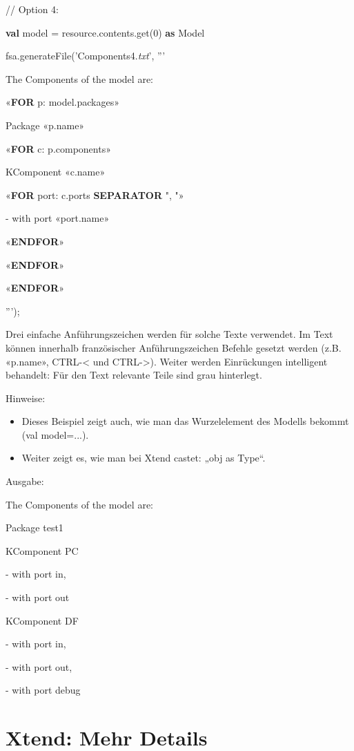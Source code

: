 \documentclass[a4]{article}
\providecommand{\tightlist}{%
  \setlength{\itemsep}{0pt}\setlength{\parskip}{0pt}}
\begin{document}
// Option 4:

\textbf{val} model = resource.contents.get(0) \textbf{as} Model

fsa.generateFile('Components4.\emph{txt}', '''

The Components of the model are:

«\textbf{FOR} p: model.packages»

Package «p.name»

«\textbf{FOR} c: p.components»

KComponent «c.name»

«\textbf{FOR} port: c.ports \textbf{SEPARATOR} ", "»

- with port «port.name»

«\textbf{ENDFOR}»

«\textbf{ENDFOR}»

«\textbf{ENDFOR}»

''');

Drei einfache Anführungszeichen werden für solche Texte verwendet. Im
Text können innerhalb französischer Anführungszeichen Befehle gesetzt
werden (z.B. «p.name», CTRL-\textless{} und CTRL-\textgreater{}). Weiter
werden Einrückungen intelligent behandelt: Für den Text relevante Teile
sind grau hinterlegt.

Hinweise:

\begin{itemize}
\tightlist
\item
  Dieses Beispiel zeigt auch, wie man das Wurzelelement des Modells
  bekommt (val model=...).
\item
  Weiter zeigt es, wie man bei Xtend castet: „obj as Type``.
\end{itemize}

Ausgabe:

The
Components of the model are:

Package test1

KComponent PC

- with port in,

- with port out

KComponent DF

- with port in,

- with port out,

- with port debug

\section[Xtend: Mehr
Details]{\texorpdfstring{\protect\hypertarget{anchor-36}{}{}Xtend: Mehr
Details}{Xtend: Mehr Details}}\label{xtend-mehr-details}
\end{document}
